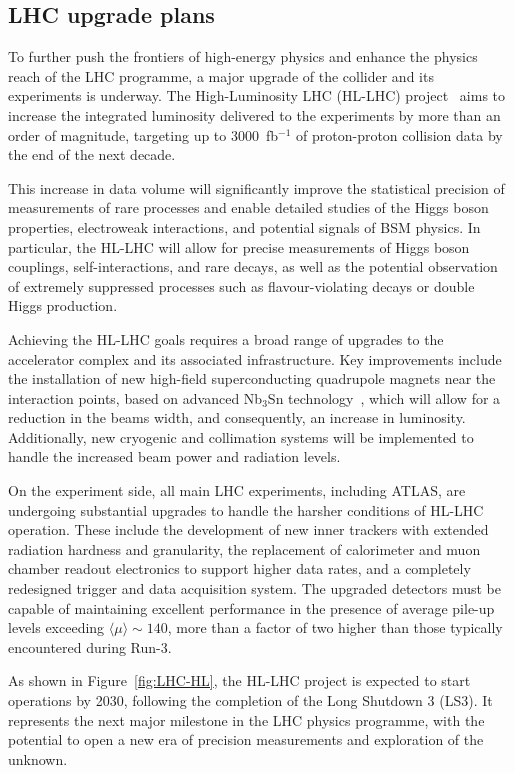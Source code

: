 \subsection{LHC upgrade plans}

To further push the frontiers of high-energy physics and enhance the physics reach of the LHC programme, a major upgrade of the collider and its experiments is underway. The High-Luminosity LHC (HL-LHC) project~\cite{HLLHC} aims to increase the integrated luminosity delivered to the experiments by more than an order of magnitude, targeting up to 3000~fb$^{-1}$ of proton-proton collision data by the end of the next decade.

This increase in data volume will significantly improve the statistical precision of measurements of rare processes and enable detailed studies of the Higgs boson properties, electroweak interactions, and potential signals of BSM physics. In particular, the HL-LHC will allow for precise measurements of Higgs boson couplings, self-interactions, and rare decays, as well as the potential observation of extremely suppressed processes such as flavour-violating decays or double Higgs production.

Achieving the HL-LHC goals requires a broad range of upgrades to the accelerator complex and its associated infrastructure. Key improvements include the installation of new high-field superconducting quadrupole magnets near the interaction points, based on advanced Nb$_3$Sn technology~\cite{Mangiarotti:2770766}, which will allow for a reduction in the beams width, and consequently, an increase in luminosity. Additionally, new cryogenic and collimation systems will be implemented to handle the increased beam power and radiation levels.

On the experiment side, all main LHC experiments, including ATLAS, are undergoing substantial upgrades to handle the harsher conditions of HL-LHC operation. These include the development of new inner trackers with extended radiation hardness and granularity, the replacement of calorimeter and muon chamber readout electronics to support higher data rates, and a completely redesigned trigger and data acquisition system. The upgraded detectors must be capable of maintaining excellent performance in the presence of average pile-up levels exceeding $\langle\mu\rangle \sim 140$, more than a factor of two higher than those typically encountered during Run-3.

As shown in Figure~\ref{fig:LHC-HL}, the HL-LHC project is expected to start operations by 2030, following the completion of the Long Shutdown 3 (LS3). It represents the next major milestone in the LHC physics programme, with the potential to open a new era of precision measurements and exploration of the unknown.


